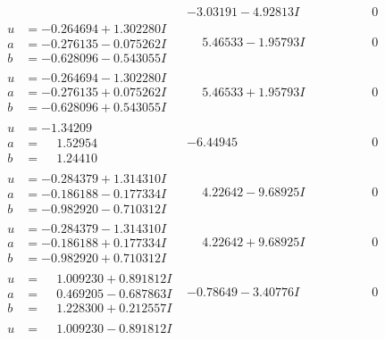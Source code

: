 \documentclass[1p]{elsarticle_modified}
\theoremstyle{definition}
\begin{document}
$$\begin{array}{c|c|c}
 & -3.03191 - 4.92813 I & \phantom{-0.000000 } 0 \\ \hline\begin{aligned}
u &= -0.264694 + 1.302280 I \\
a &= -0.276135 - 0.075262 I \\
b &= -0.628096 - 0.543055 I\end{aligned}
 & \phantom{-}5.46533 - 1.95793 I & \phantom{-0.000000 } 0 \\ \hline\begin{aligned}
u &= -0.264694 - 1.302280 I \\
a &= -0.276135 + 0.075262 I \\
b &= -0.628096 + 0.543055 I\end{aligned}
 & \phantom{-}5.46533 + 1.95793 I & \phantom{-0.000000 } 0 \\ \hline\begin{aligned}
u &= -1.34209\phantom{ +0.000000I} \\
a &= \phantom{-}1.52954\phantom{ +0.000000I} \\
b &= \phantom{-}1.24410\phantom{ +0.000000I}\end{aligned}
 & -6.44945\phantom{ +0.000000I} & \phantom{-0.000000 } 0 \\ \hline\begin{aligned}
u &= -0.284379 + 1.314310 I \\
a &= -0.186188 - 0.177334 I \\
b &= -0.982920 - 0.710312 I\end{aligned}
 & \phantom{-}4.22642 - 9.68925 I & \phantom{-0.000000 } 0 \\ \hline\begin{aligned}
u &= -0.284379 - 1.314310 I \\
a &= -0.186188 + 0.177334 I \\
b &= -0.982920 + 0.710312 I\end{aligned}
 & \phantom{-}4.22642 + 9.68925 I & \phantom{-0.000000 } 0 \\ \hline\begin{aligned}
u &= \phantom{-}1.009230 + 0.891812 I \\
a &= \phantom{-}0.469205 - 0.687863 I \\
b &= \phantom{-}1.228300 + 0.212557 I\end{aligned}
 & -0.78649 - 3.40776 I & \phantom{-0.000000 } 0 \\ \hline\begin{aligned}
u &= \phantom{-}1.009230 - 0.891812 I \\

\end{aligned}
\end{array}$$
\end{document}
